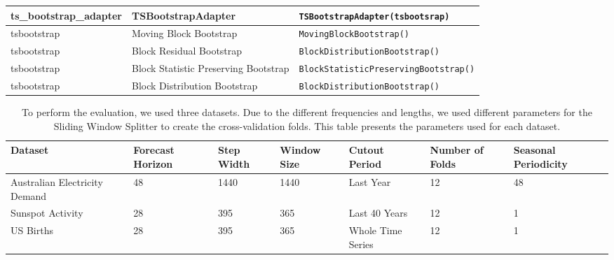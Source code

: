 \begin{table}[]
\begin{tabular}{p{2.5cm}p{4cm}|p{7.5cm}}
         ts\_bootstrap\_adapter & TSBootstrapAdapter & \texttt{TSBootstrapAdapter(tsbootsrap)} \\
         \midrule

         tsbootstrap & Moving Block Bootstrap & \texttt{MovingBlockBootstrap()} \\
         tsbootstrap & Block Residual Bootstrap & \texttt{BlockDistributionBootstrap()} \\
         tsbootstrap & Block Statistic Preserving Bootstrap & \texttt{BlockStatisticPreservingBootstrap()} \\
         tsbootstrap & Block Distribution Bootstrap & \texttt{BlockDistributionBootstrap()}\\

         \bottomrule

    \end{tabular}
\end{table}

\begin{table}[h]
    \centering
    \footnotesize
    \caption{To perform the evaluation, we used three datasets. Due to the different frequencies and lengths, we used different parameters for the Sliding Window Splitter to create the cross-validation folds. This table presents the parameters used for each dataset.}
    \label{tab:datasets}
    \begin{tabularx}{\textwidth}{X|X|X|X|X|X|X}
         \toprule
        Dataset & Forecast Horizon & Step Width & Window Size & Cutout Period & Number of Folds & Seasonal Periodicity \\ \midrule
        Australian Electricity Demand & 48 & 1440 & 1440 & Last Year & 12 & 48 \\
        Sunspot Activity & 28 & 395 & 365 & Last 40 Years & 12 & 1\\
        US Births & 28 & 395 & 365 & Whole Time Series & 12 & 1 \\
        \bottomrule
    \end{tabularx}
\end{table}


